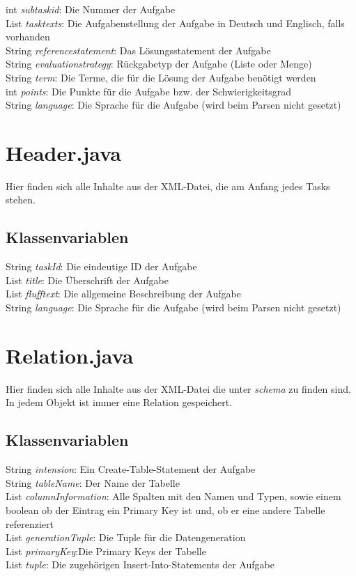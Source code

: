 \documentclass[11pt]{report}
\begin{document}
int \textit{subtaskid}: Die Nummer der Aufgabe\\
List \textit{tasktexts}: Die Aufgabenstellung der Aufgabe in Deutsch und Englisch, falls vorhanden \\
String \textit{referencestatement}: Das Lösungsstatement der Aufgabe \\
String \textit{evaluationstrategy}: Rückgabetyp der Aufgabe (Liste oder Menge) \\
String \textit{term}: Die Terme, die für die Lösung der Aufgabe benötigt werden \\
int \textit{points}: Die Punkte für die Aufgabe bzw. der Schwierigkeitsgrad \\
String \textit{language}: Die Sprache für die Aufgabe (wird beim Parsen nicht gesetzt)

\section{Header.java}

Hier finden sich alle Inhalte aus der XML-Datei, die am Anfang jedes Tasks stehen.

\subsection*{Klassenvariablen}

String \textit{taskId}: Die eindeutige ID der Aufgabe \\
List \textit{title}: Die Überschrift der Aufgabe \\
List \textit{flufftext}: Die allgemeine Beschreibung der Aufgabe \\
String \textit{language}: Die Sprache für die Aufgabe (wird beim Parsen nicht gesetzt)

\section{Relation.java}

Hier finden sich alle Inhalte aus der XML-Datei die unter \textit{schema} zu finden sind. In jedem Objekt ist immer eine Relation gespeichert.

\subsection*{Klassenvariablen}
String \textit{intension}: Ein Create-Table-Statement der Aufgabe \\
String \textit{tableName}: Der Name der Tabelle \\
List \textit{columnInformation}: Alle Spalten mit den Namen und Typen, sowie einem boolean ob der Eintrag ein Primary Key ist und, ob er eine andere Tabelle referenziert\\
List \textit{generationTuple}: Die Tuple für die Datengeneration \\
List \textit{primaryKey}:Die Primary Keys der Tabelle \\
List \textit{tuple}: Die zugehörigen Insert-Into-Statements der Aufgabe
\end{document}

